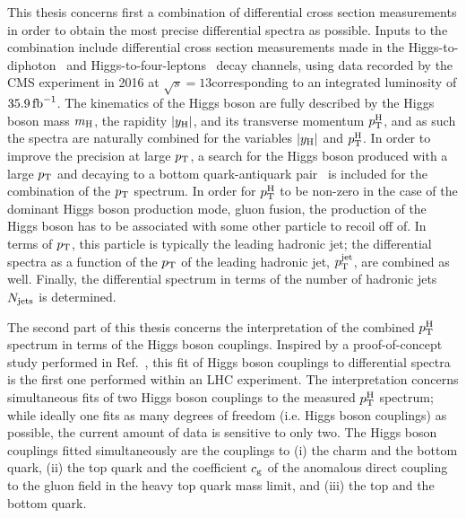 This thesis concerns first a combination of differential cross section measurements in order to obtain the most precise differential spectra as possible.
% 
Inputs to the combination include differential cross section measurements made in the Higgs-to-diphoton~\cite{Sirunyan:2018kta} and Higgs-to-four-leptons~\cite{Sirunyan:2017exp} decay channels, using data recorded by the CMS experiment in 2016 at $\sqrt{s}=13$\TeV corresponding to an integrated luminosity of $35.9\,\text{fb}^{-1}$.
% 
The kinematics of the Higgs boson are fully described by the Higgs boson mass $m_{\mathrm{H}}$, the rapidity $\left|y_\mathrm{H}\right| $, and its transverse momentum $p_\mathrm{T}^\mathrm{H}$, and as such the spectra are naturally combined for the variables $\left|y_\mathrm{H}\right| $ and $p_\mathrm{T}^\mathrm{H}$.
% 
In order to improve the precision at large $p_\mathrm{T}$, a search for the Higgs boson produced with a large $p_\mathrm{T}$ and decaying to a bottom quark-antiquark pair~\cite{Sirunyan:2017dgc} is included for the combination of the $p_\mathrm{T}$ spectrum.
% 
% 
In order for $p_\mathrm{T}^\mathrm{H}$ to be non-zero in the case of the dominant Higgs boson production mode, gluon fusion, the production of the Higgs boson has to be associated with some other particle to recoil off of.
% 
In terms of $p_\mathrm{T}$, this particle is typically the leading hadronic jet; the differential spectra as a function of the $p_\mathrm{T}$ of the leading hadronic jet, $p_\mathrm{T}^\text{jet} $, are combined as well.
% 
Finally, the differential spectrum in terms of the number of hadronic jets $N_\text{jets} $ is determined.


The second part of this thesis concerns the interpretation of the combined $p_\mathrm{T}^\mathrm{H}$ spectrum in terms of the Higgs boson couplings.
% 
Inspired by a proof-of-concept study performed in Ref.~\cite{Bishara:2016jga}, this fit of Higgs boson couplings to differential spectra is the first one performed within an LHC experiment.
% 
The interpretation concerns simultaneous fits of two Higgs boson couplings to the measured $p_\mathrm{T}^\mathrm{H}$ spectrum; while ideally one fits as many degrees of freedom (i.e. Higgs boson couplings) as possible, the current amount of data is sensitive to only two.
% 
The Higgs boson couplings fitted simultaneously are the couplings to (i) the charm and the bottom quark, (ii) the top quark and the coefficient $c_\mathrm{g}$ of the anomalous direct coupling to the gluon field in the heavy top quark mass limit, and (iii) the top and the bottom quark.


